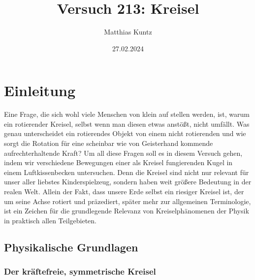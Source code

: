 \documentclass{article}
\title{Versuch 213: Kreisel}
\author{Matthias Kuntz}
\date{27.02.2024}
\begin{document}
\maketitle

\tableofcontents

\newpage

\section{Einleitung}

Eine Frage, die sich wohl viele Menschen von klein auf stellen werden, ist, warum ein rotierender Kreisel, selbst wenn man diesen etwas anstößt, nicht umfällt. Was genau unterscheidet ein rotierendes Objekt von einem nicht rotierenden und wie sorgt die Rotation für eine scheinbar wie von Geisterhand kommende aufrechterhaltende Kraft? Um all diese Fragen soll es in diesem Versuch gehen, indem wir verschiedene Bewegungen einer als Kreisel fungierenden Kugel in einem Luftkissenbecken untersuchen. Denn die Kreisel sind nicht nur relevant für unser aller liebstes Kinderspielzeug, sondern haben weit größere Bedeutung in der realen Welt. Allein der Fakt, dass unsere Erde selbst ein riesiger Kreisel ist, der um seine Achse rotiert und präzediert, später mehr zur allgemeinen Terminologie, ist ein Zeichen für die grundlegende Relevanz von Kreiselphänomenen der Physik in praktisch allen Teilgebieten.

\subsection{Physikalische Grundlagen}

\subsubsection{Der kräftefreie, symmetrische Kreisel}
\end{document}
